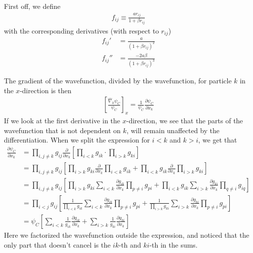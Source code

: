 \documentclass[twocolumns, a4paper,11pt,fleqn]{extarticle}
\newcommand{\eq}[1]{{\small\begin{align*}#1\end{align*}}}
\newcommand{\equ}[1]{{\small\begin{align}#1\end{align}}}
\newcommand{\op}[1]{\hat{#1}}
\begin{document}
First off, we define
\eq{
  f_{ij} \equiv \frac{ar_{ij}}{1+\beta r_{ij}}
}
with the corresponding derivatives (with respect to $r_{ij}$)
\eq{
  f_{ij}' &= \frac{a}{(1+\beta r_{ij})^2}\\
  f_{ij}'' &= \frac{-2a\beta}{(1+\beta r_{ij})^3}
}

The gradient of the wavefunction, 
divided by the wavefunction, for particle $k$ in the $x$-direction is then
\eq{
  \left[\frac{\op\nabla_k\psi_C}{\psi_C}\right]_x 
  =\frac{1}{\psi_C}\frac{\partial\psi_C}{\partial x_k}
}
If we look at the first derivative in the $x$-direction, 
we see that the parts of the wavefunction that is not dependent on $k$, 
will remain unaffected by the 
differentiation.
When we split the expression for $i<k$ and $k>i$, we get that
\equ{
  \frac{\partial\psi_C}{\partial x_k}&=\prod_{i,j\neq k} g_{ij}
    \frac{\partial}{\partial x_k}
    \left[ \prod_{i<k} g_{ik} \cdot \prod_{i>k} g_{ki} \right]\nonumber\\
    &=\prod_{i,j\neq k} g_{ij}
      \left[\prod_{i>k} g_{ki}\frac{\partial}{\partial x_k}\prod_{i<k} g_{ik} 
      + \prod_{i<k} g_{ik} \frac{\partial}{\partial x_k}\prod_{i>k} g_{ki} \right]
      \nonumber\\
    &=\prod_{i,j\neq k} g_{ij}
      \left[\prod_{i>k} g_{ki} \sum_{i<k} \frac{\partial g_{ik}}{\partial x_k} \prod_{p\neq i} g_{pi}
      + \prod_{i<k} g_{ik} \sum_{i>k} \frac{\partial g_{ki}}{\partial x_k} \prod_{q\neq i} g_{iq} \right]
      \nonumber\\
    &=\prod_{i<j} g_{ij}
      \left[\frac{1}{\prod_{i<k} g_{ik}} \sum_{i<k} 
      \frac{\partial g_{ik}}{\partial x_k} \prod_{p\neq i} g_{pi}
      + \frac{1}{\prod_{i>k} g_{ki}} \sum_{i>k} 
      \frac{\partial g_{ki}}{\partial x_k} \prod_{p\neq i} g_{pi} \right]
      \nonumber\\
    &=\psi_C
      \left[\sum_{i<k} \frac{1}{g_{ik}} \frac{\partial g_{ik}}{\partial x_k}
      +\sum_{i>k} \frac{1}{g_{ki}} \frac{\partial g_{ki}}{\partial x_k} \right]
      \label{DpsiC}
}
Here we factorized the wavefunction outside the expression, 
and noticed that the only part that doesn't cancel is the $ik$-th and $ki$-th
in the sums.
\end{document}
